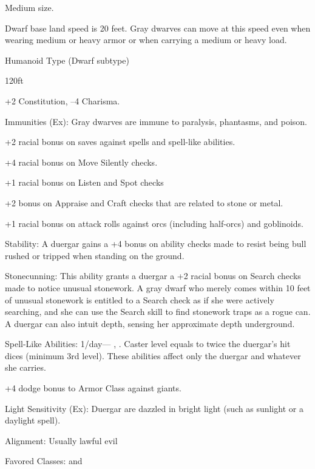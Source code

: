 \begin{multicols}{2}

\begin{itemize*}
\item Medium size.
\item Dwarf base land speed is 20 feet. Gray dwarves can move at this speed even when wearing medium or heavy armor or when carrying a medium or heavy load.
\item Humanoid Type (Dwarf subtype)
\item {} 120ft
\item +2 Constitution, –4 Charisma.
\item Immunities (Ex): Gray dwarves are immune to paralysis, phantasms, and poison.
\item  +2 racial bonus on saves against spells and spell-like abilities.
\item +4 racial bonus on Move Silently checks.
\item +1 racial bonus on Listen and Spot checks
\item +2 bonus on Appraise and Craft checks that are related to stone or metal.
\item +1 racial bonus on attack rolls against orcs (including half-orcs) and goblinoids.
\item Stability: A duergar gains a +4 bonus on ability checks made to resist being bull rushed or tripped when standing on the ground.
\item Stonecunning: This ability grants a duergar a +2 racial bonus on Search checks made to notice unusual stonework. A gray dwarf who merely comes within 10 feet of unusual stonework is entitled to a Search check as if she were actively searching, and she can use the Search skill to find stonework traps as a rogue can. A duergar can also intuit depth, sensing her approximate depth underground.
\item Spell-Like Abilities: 1/day— , . Caster level equals to twice the duergar’s hit dices (minimum 3rd level). These abilities affect only the duergar and whatever she carries.
\item +4 dodge bonus to Armor Class against giants.
\item Light Sensitivity (Ex): Duergar are dazzled in bright light (such as sunlight or a daylight spell).
\item Alignment: Usually lawful evil
\item Favored Classes:  and 
\end{itemize*}


\end{multicols}

